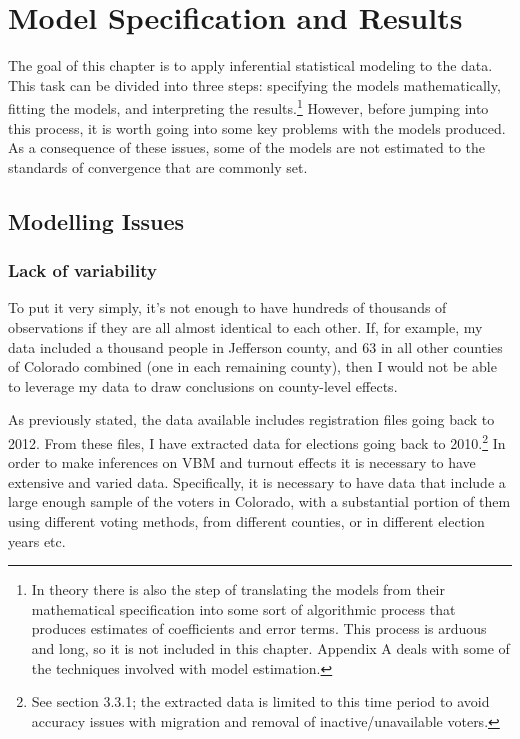 \documentclass[12pt,twoside]{reedthesis}
\begin{document}
  \chapter{Model Specification and
  Results}\label{model-specification-and-results}
  
  The goal of this chapter is to apply inferential statistical modeling to
  the data. This task can be divided into three steps: specifying the
  models mathematically, fitting the models, and interpreting the
  results.\footnote{In theory there is also the step of translating the
    models from their mathematical specification into some sort of
    algorithmic process that produces estimates of coefficients and error
    terms. This process is arduous and long, so it is not included in this
    chapter. Appendix A deals with some of the techniques involved with
    model estimation.} However, before jumping into this process, it is
  worth going into some key problems with the models produced. As a
  consequence of these issues, some of the models are not estimated to the
  standards of convergence that are commonly set.
  
  \section{Modelling Issues}\label{modelling-issues}
  
  \subsection{Lack of variability}\label{lack-of-variability}
  
  To put it very simply, it's not enough to have hundreds of thousands of
  observations if they are all almost identical to each other. If, for
  example, my data included a thousand people in Jefferson county, and 63
  in all other counties of Colorado combined (one in each remaining
  county), then I would not be able to leverage my data to draw
  conclusions on county-level effects.
  
  As previously stated, the data available includes registration files
  going back to 2012. From these files, I have extracted data for
  elections going back to 2010.\footnote{See section 3.3.1; the extracted
    data is limited to this time period to avoid accuracy issues with
    migration and removal of inactive/unavailable voters.} In order to
  make inferences on VBM and turnout effects it is necessary to have
  extensive and varied data. Specifically, it is necessary to have data
  that include a large enough sample of the voters in Colorado, with a
  substantial portion of them using different voting methods, from
  different counties, or in different election years etc.
  
\end{document}
